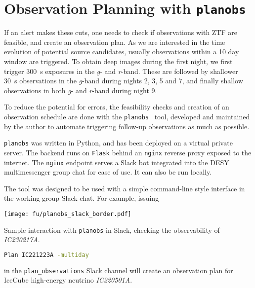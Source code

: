 \section{Observation Planning with \texttt{planobs}}\label{planobs}

If an alert makes these cuts, one needs to check if observations with ZTF are feasible, and create an observation plan. As we are interested in the time evolution of potential source candidates, usually observations within a 10 day window are triggered. To obtain deep images during the first night, we first trigger \SI{300}{\second} exposures in the \textit{g}- and \textit{r}-band. These are followed by shallower \SI{30}{\second} observations in the \textit{g}-band during nights 2, 3, 5 and 7, and finally shallow observations in both \textit{g}- and \textit{r}-band during night 9.

To reduce the potential for errors, the feasibility checks and creation of an observation schedule are done with the \texttt{planobs}~ tool, developed and maintained by the author to automate triggering follow-up observations as much as possible.

\texttt{planobs} was written in Python, and has been deployed on a virtual private server. The backend runs on \texttt{Flask} behind an \texttt{nginx} reverse proxy exposed to the internet. The \texttt{nginx} endpoint serves a Slack bot integrated into the DESY multimessenger group chat for ease of use. It can also be run locally.

The tool was designed to be used with a simple command-line style interface in the working group Slack chat. For example, issuing

\begin{marginfigure}
    \texttt{[image: fu/planobs\_slack\_border.pdf]}
    \caption[\texttt{planobs} Slack interaction]{Sample interaction with \texttt{planobs} in Slack, checking the observability of \textit{IC230217A}.}
\end{marginfigure}

\begin{lstlisting}[language=bash,style=kaolstplain]
Plan IC221223A -multiday
\end{lstlisting}
in the \texttt{plan\_observations} Slack channel will create an observation plan for IceCube high-energy neutrino \textit{IC220501A}.

